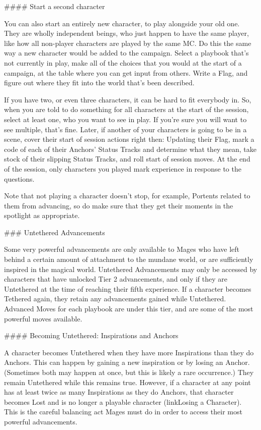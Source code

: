 \documentclass[
  oneside,
  statementpaper,
  9pt]{memoir}
\begin{document}
\begin{Player}
#### Start a second character

You can also start an entirely new character, to play alongside your old one. They are wholly independent beings, who just happen to have the same player, like how all non-player characters are played by the same MC. Do this the same way a new character would be added to the campaign. Select a playbook that’s not currently in play, make all of the choices that you would at the start of a campaign, at the table where you can get input from others. Write a Flag, and figure out where they fit into the world that’s been described.

If you have two, or even three characters, it can be hard to fit everybody in. So, when you are told to do something for all characters at the start of the session, select at least one, who you want to see in play. If you’re sure you will want to see multiple, that’s fine. Later, if another of your characters is going to be in a scene, cover their start of session actions right then: Updating their Flag, mark a code of each of their Anchors’ Status Tracks and determine what they mean, take stock of their slipping Status Tracks, and roll start of session moves. At the end of the session, only characters you played mark experience in response to the questions.

Note that not playing a character doesn’t stop, for example, Portents related to them from advancing, so do make sure that they get their moments in the spotlight as appropriate.

### Untethered Advancements

Some very powerful advancements are only available to Mages who have left behind a certain amount of attachment to the mundane world, or are sufficiently inspired in the magical world. Untethered Advancements may only be accessed by characters that have unlocked Tier 2 advancements, and only if they are Untethered at the time of reaching their fifth experience. If a character becomes Tethered again, they retain any advancements gained while Untethered. Advanced Moves for each playbook are under this tier, and are some of the most powerful moves available.

#### Becoming Untethered: Inspirations and Anchors

A character becomes Untethered when they have more Inspirations than they do Anchors. This can happen by gaining a new inspiration or by losing an Anchor. (Sometimes both may happen at once, but this is likely a rare occurrence.) They remain Untethered while this remains true. However, if a character at any point has at least twice as many Inspirations as they do Anchors, that character becomes Lost and is no longer a playable character ({{linkLosing a Character}}). This is the careful balancing act Mages must do in order to access their most powerful advancements.


\end{Player}
\end{document}
